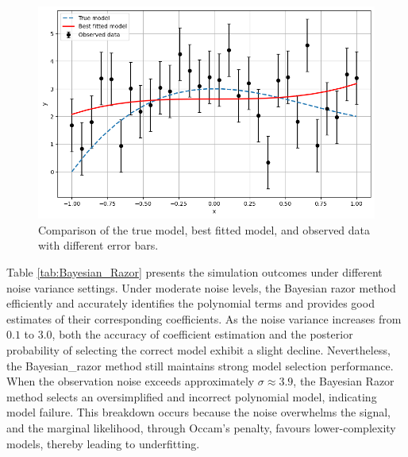 \begin{figure}[htbp]
\begin{minipage}{0.47\textwidth}
\end{minipage}
\begin{minipage}{0.47\textwidth}
    \centering
    \includegraphics[width=\linewidth]{MSc_Statistics_Research_Report_Template/images/n=30, sigma=0.95.png}
\end{minipage}
\caption{Comparison of the true model, best fitted model, and observed data with different error bars.}
\label{fig:n=30}
\end{figure}

Table \ref{tab:Bayesian_Razor} presents the simulation outcomes under different noise variance settings. Under moderate noise levels, the Bayesian razor method efficiently and accurately identifies the polynomial terms and provides good estimates of their corresponding coefficients. As the noise variance increases from $0.1$ to $3.0$, both the accuracy of coefficient estimation and the posterior probability of selecting the correct model exhibit a slight decline. Nevertheless, the Bayesian\_razor method still maintains strong model selection performance. 
When the observation noise exceeds approximately 
$\sigma \approx 3.9$, the Bayesian Razor method selects an oversimplified and incorrect polynomial model, indicating model failure. 
This breakdown occurs because the noise overwhelms the signal, and the 
marginal likelihood, through Occam's penalty, favours lower-complexity 
models, thereby leading to underfitting.


